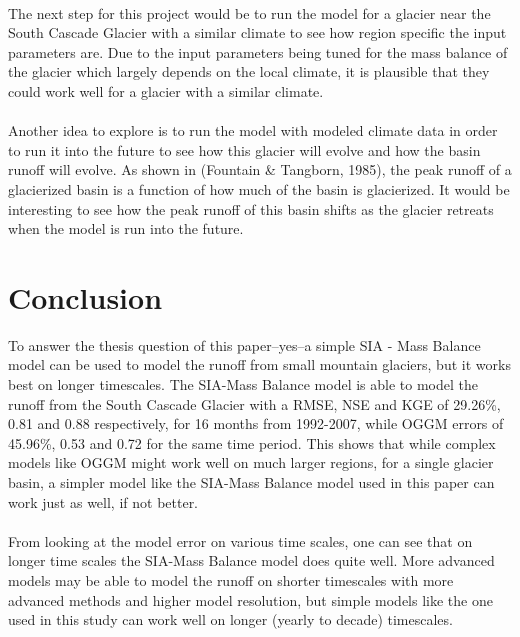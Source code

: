 \documentclass{article}
\begin{document}
\paragraph{}
The next step for this project would be to run the model for a glacier near the South Cascade Glacier with a similar climate to see how region specific the input 
parameters are. Due to the input parameters being tuned for the mass balance of the glacier which largely depends on the local climate, it 
is plausible that they could work well for a glacier with a similar climate.
\paragraph{}
Another idea to explore is to run the model with modeled climate data in order to run it into the future to see how this glacier 
will evolve and how the basin runoff will evolve. As shown in (Fountain \& Tangborn, 1985), the peak runoff of a glacierized basin is a function of 
how much of the basin is glacierized. It would be interesting to see how the peak runoff of this basin shifts as the glacier retreats when the model 
is run into the future.
\section{Conclusion}
To answer the thesis question of this paper--yes--a simple SIA - Mass Balance model can be used to model the runoff from small mountain glaciers, but 
it works best on longer timescales.
The SIA-Mass Balance model is able to model the runoff from the South Cascade Glacier with a RMSE, NSE and KGE of 29.26\%, 0.81 and 0.88 respectively, 
for 16 months from 1992-2007, while OGGM errors of 45.96\%, 0.53 and 0.72 for the same time period. 
This shows that while complex models like OGGM might work well on much larger regions, for a single glacier basin, a simpler model like the SIA-Mass 
Balance model used in this paper can work just as well, if not better.
\paragraph{}
From looking at the model error on various time scales, one can see that on longer time scales the SIA-Mass Balance model does quite well. More 
advanced models may be able to model the runoff on shorter timescales with more advanced methods and higher model resolution, but simple models 
like the one used in this study can work well on longer (yearly to decade) timescales.
\end{document}
